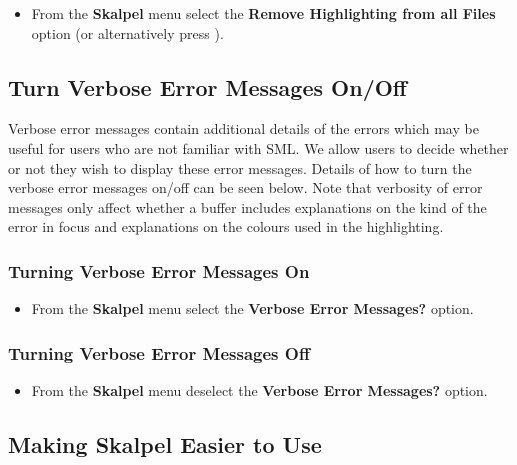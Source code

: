 \documentclass{report}
\begin{document}
\begin{itemize}
\item From the \textbf{Skalpel} menu select the \textbf{Remove
  Highlighting from all Files} option (or alternatively press
  ).
\end{itemize}


\subsection{Turn Verbose Error Messages On/Off}

Verbose error messages contain additional details of the errors which
may be useful for users who are not familiar with SML.  We allow users
to decide whether or not they wish to display these error messages.
Details of how to turn the verbose error messages on/off can be seen
below.  Note that verbosity of error messages only affect whether a
buffer includes explanations on the kind of the error in focus and
explanations on the colours used in the highlighting.

\subsubsection{Turning Verbose Error Messages On}

  \begin{itemize}
  \item From the \textbf{Skalpel}
    menu select the \textbf{Verbose Error Messages?} option.
  \end{itemize}

\subsubsection{Turning Verbose Error Messages Off}

  \begin{itemize}
  \item From the \textbf{Skalpel} menu
    deselect the \textbf{Verbose Error Messages?} option.
  \end{itemize}


\subsection{Making Skalpel Easier to Use}
\end{document}
